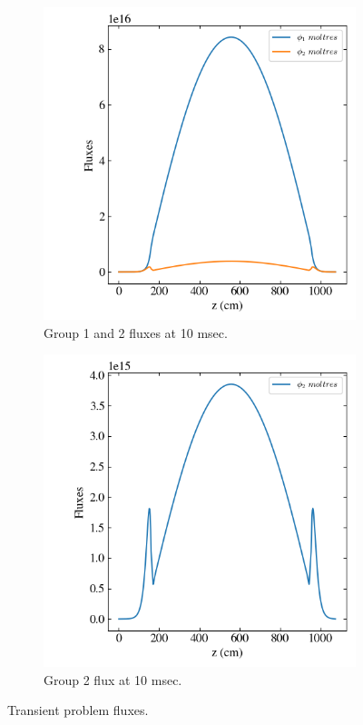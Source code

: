 \documentclass[11pt,letterpaper]{article}
\begin{document}
	\begin{figure}[htbp!]
		\centering
		\begin{subfigure}[t]{0.4\textwidth}
			\centering
			\includegraphics[width=\linewidth]{2D-fuel-reflec-action}
			\caption{Group 1 and 2 fluxes at 10 msec.}
		\end{subfigure}
		\begin{subfigure}[t]{0.4\textwidth}
			\centering
			\includegraphics[width=\linewidth]{2D-fuel-reflec-action-g2}
			\caption{Group 2 flux at 10 msec.}
		\end{subfigure}
		\hfill
		\caption{Transient problem fluxes.}
		\label{fig:2D-fuel-reflec}
	\end{figure}
\end{document}
